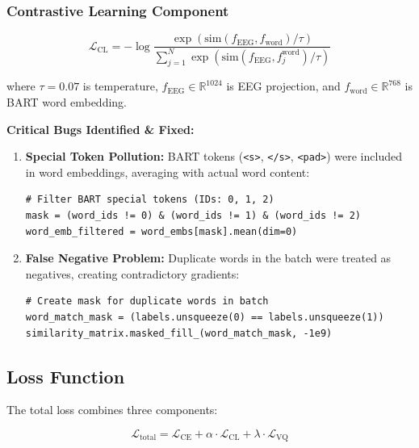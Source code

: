 \documentclass[12pt,a4paper]{article}
\begin{document}
\subsubsection{Contrastive Learning Component}
\begin{equation}
\mathcal{L}_{\text{CL}} = -\log \frac{\exp(\text{sim}(f_{\text{EEG}}, f_{\text{word}}) / \tau)}{\sum_{j=1}^{N} \exp(\text{sim}(f_{\text{EEG}}, f_j^{\text{word}}) / \tau)}
\end{equation}

\noindent where $\tau = 0.07$ is temperature, $f_{\text{EEG}} \in \mathbb{R}^{1024}$ is EEG projection, and $f_{\text{word}} \in \mathbb{R}^{768}$ is BART word embedding.

\textbf{Critical Bugs Identified \& Fixed:}
\begin{enumerate}
    \item \textbf{Special Token Pollution:} BART tokens (\texttt{\textless s\textgreater}, \texttt{\textless /s\textgreater}, \texttt{\textless pad\textgreater}) were included in word embeddings, averaging with actual word content:
    \begin{lstlisting}[caption=Special Token Filtering]
# Filter BART special tokens (IDs: 0, 1, 2)
mask = (word_ids != 0) & (word_ids != 1) & (word_ids != 2)
word_emb_filtered = word_embs[mask].mean(dim=0)
    \end{lstlisting}
    
    \item \textbf{False Negative Problem:} Duplicate words in the batch were treated as negatives, creating contradictory gradients:
    \begin{lstlisting}[caption=Duplicate Word Masking]
# Create mask for duplicate words in batch
word_match_mask = (labels.unsqueeze(0) == labels.unsqueeze(1))
similarity_matrix.masked_fill_(word_match_mask, -1e9)
    \end{lstlisting}
\end{enumerate}

\subsection{Loss Function}

The total loss combines three components:

\begin{equation}
\mathcal{L}_{\text{total}} = \mathcal{L}_{\text{CE}} + \alpha \cdot \mathcal{L}_{\text{CL}} + \lambda \cdot \mathcal{L}_{\text{VQ}}
\end{equation}
\end{document}
